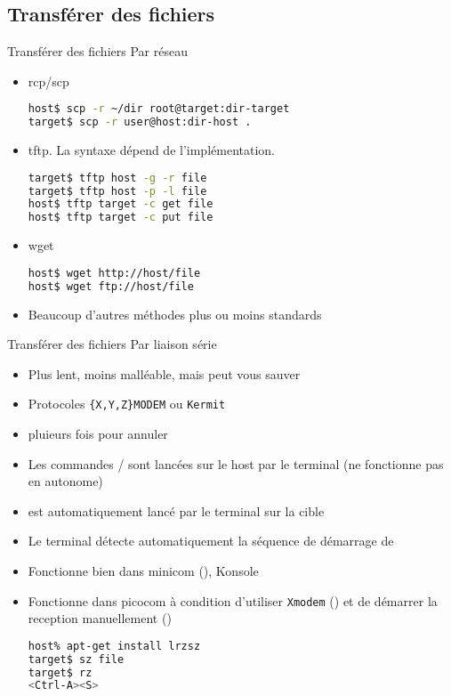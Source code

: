 \subsection{Transférer des fichiers}

\begin{frame}[fragile=singleslide]{Transférer des fichiers}
  Par réseau
  \begin{itemize}
  \item rcp/scp
\begin{lstlisting}[language=sh]
host$ scp -r ~/dir root@target:dir-target
target$ scp -r user@host:dir-host .
\end{lstlisting} %
  \item tftp. La syntaxe dépend de l'implémentation.
  \note[item] 
\begin{lstlisting}[language=sh]
target$ tftp host -g -r file
target$ tftp host -p -l file
host$ tftp target -c get file
host$ tftp target -c put file
\end{lstlisting} %
  \item wget
\begin{lstlisting}[language=sh]
host$ wget http://host/file
host$ wget ftp://host/file
\end{lstlisting} %
  \item Beaucoup d'autres méthodes plus ou moins standards
  \end{itemize}
\end{frame}

\begin{frame}[fragile=singleslide]{Transférer des fichiers}
  Par liaison série
  \begin{itemize}
  \item Plus lent, moins malléable, mais peut vous sauver
  \item Protocoles \verb+{X,Y,Z}MODEM+ ou \verb+Kermit+
  \item {} pluieurs fois pour annuler
  \item Les commandes / sont lancées sur le host par le terminal
    (ne fonctionne pas en autonome)
  \item {} est automatiquement lancé par le terminal sur la cible
  \item Le terminal détecte automatiquement la séquence de démarrage de 
  \item Fonctionne bien dans minicom (), Konsole
  \item Fonctionne dans picocom à condition d'utiliser \verb+Xmodem+
    () et de démarrer la reception manuellement
    ()
\begin{lstlisting}[language=sh]
host% apt-get install lrzsz
target$ sz file
target$ rz
<Ctrl-A><S>
\end{lstlisting} %
  \end{itemize}
\end{frame}

